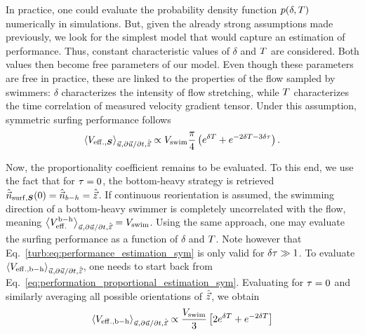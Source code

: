 In practice, one could evaluate the probability density function $p(\delta, T)$ numerically in simulations.
But, given the already strong assumptions made previously, we look for the simplest model that would capture an estimation of performance.
Thus, constant characteristic values of $\delta$ and $T$ are considered.
Both values then become free parameters of our model.
Even though these parameters are free in practice, these are linked to the properties of the flow sampled by swimmers:
$\delta$ characterizes the intensity of flow stretching, while $T$ characterizes the time correlation of measured velocity gradient tensor.
Under this assumption, symmetric surfing performance follows
\begin{equation}\label{turb:eq:performance_estimation_sym}
	\left\langle V_{\mathrm{eff.}, \boldsymbol{S}} \right\rangle_{\vec{u}, \partial \vec{u} / \partial t, \hat{\vec{z}}} \propto V_{\mathrm{swim}} \frac{\pi}{4} \left( e^{\delta T} + e^{-2 \delta T - 3 \delta \tau} \right).
\end{equation}

Now, the proportionality coefficient remains to be evaluated.
To this end, we use the fact that for $\tau = 0$, the bottom-heavy strategy is retrieved $\hat{\vec{n}}_{\mathrm{surf}, \boldsymbol{S}}(0) = \hat{\vec{n}}_{b-h} = \hat{\vec{z}}$.
If continuous reorientation is assumed, the swimming direction of a bottom-heavy swimmer is completely uncorrelated with the flow, meaning $\left\langle V_{\mathrm{eff.}}^{\mathrm{b-h}} \right\rangle_{\vec{u}, \partial \vec{u} / \partial t, \hat{\vec{z}}} = V_{\mathrm{swim}}$.
Using the same approach, one may evaluate the surfing performance as a function of $\delta$ and $T$.
Note however that Eq.~\eqref{turb:eq:performance_estimation_sym} is only valid for $\delta \tau \gg 1$.
To evaluate $\left\langle V_{\mathrm{eff.}, \mathrm{b-h}} \right\rangle_{\vec{u}, \partial \vec{u} / \partial t, \hat{\vec{z}}}$, one needs to start back from Eq.~\eqref{eq:performation_proportional_estimation_sym}.
Evaluating for $\tau = 0$ and similarly averaging all possible orientations of $\hat{\vec{z}}$, we obtain
\begin{equation}\label{turb:eq:performance_estimation_sym_bh}
	 \left\langle V_{\mathrm{eff.}, \mathrm{b-h}} \right\rangle_{\vec{u}, \partial \vec{u} / \partial t, \hat{\vec{z}}} \propto \frac{V_{\mathrm{swim}}}{3} \left[ 2 e^{\delta T} + e^{-2 \delta T} \right]
\end{equation}

